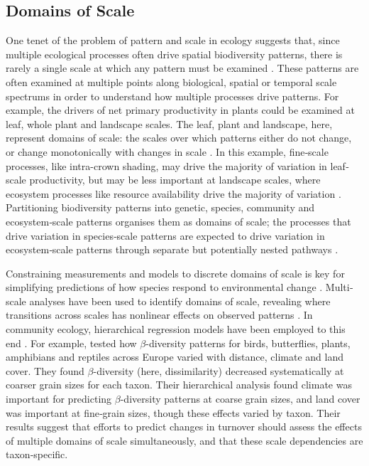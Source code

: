 \subsection{Domains of Scale}

One tenet of the problem of pattern and scale in ecology suggests that, since multiple ecological processes often drive spatial biodiversity patterns, there is rarely a single scale at which any pattern must be examined \cite{Hutchinson1953-md,Levin1992-ga}. These patterns are often examined at multiple points along biological, spatial or temporal scale spectrums in order to understand how multiple processes drive patterns. For example, the drivers of net primary productivity in plants could be examined at leaf, whole plant and landscape scales. The leaf, plant and landscape, here, represent domains of scale: the scales over which patterns either do not change, or change monotonically with changes in scale \cite{Wiens1989-yi}. In this example, fine‐scale processes, like intra-crown shading, may drive the majority of variation in leaf‐scale productivity, but may be less important at landscape scales, where ecosystem processes like resource availability drive the majority of variation \cite{Field1995-jy}. Partitioning biodiversity patterns into genetic, species, community and ecosystem‐scale patterns organises them as domains of scale; the processes that drive variation in species‐scale patterns are expected to drive variation in ecosystem‐scale patterns through separate but potentially nested pathways \cite{Pereira2012-vm,Pereira2013-pk}.

Constraining measurements and models to discrete domains of scale is key for simplifying predictions of how species respond to environmental change \cite{Field1991-pk}. Multi‐scale analyses have been used to identify domains of scale, revealing where transitions across scales has nonlinear effects on observed patterns \cite{Palmer1994-ya}. In community ecology, hierarchical regression models have been employed to this end \cite{Legendre2005-zb}. For example, \cite{Keil2012-ad} tested how $\beta$-diversity patterns for birds, butterflies, plants, amphibians and reptiles across Europe varied with distance, climate and land cover. They found $\beta$-diversity (here, dissimilarity) decreased systematically at coarser grain sizes for each taxon. Their hierarchical analysis found climate was important for predicting $\beta$-diversity patterns at coarse grain sizes, and land cover was important at fine‐grain sizes, though these effects varied by taxon. Their results suggest that efforts to predict changes in turnover should assess the effects of multiple domains of scale simultaneously, and that these scale dependencies are taxon‐specific.

